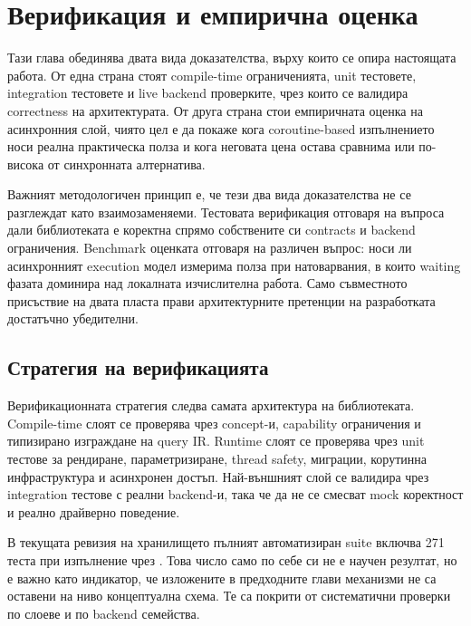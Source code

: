 \section{Верификация и емпирична оценка}
\label{sec:verification_evaluation}

Тази глава обединява двата вида доказателства, върху които се опира настоящата работа. От една страна стоят compile-time ограниченията, unit тестовете, integration тестовете и live backend проверките, чрез които се валидира correctness на архитектурата. От друга страна стои емпиричната оценка на асинхронния слой, чиято цел е да покаже кога coroutine-based изпълнението носи реална практическа полза и кога неговата цена остава сравнима или по-висока от синхронната алтернатива.

Важният методологичен принцип е, че тези два вида доказателства не се разглеждат като взаимозаменяеми. Тестовата верификация отговаря на въпроса дали библиотеката е коректна спрямо собствените си contracts и backend ограничения. Benchmark оценката отговаря на различен въпрос: носи ли асинхронният execution модел измерима полза при натоварвания, в които waiting фазата доминира над локалната изчислителна работа. Само съвместното присъствие на двата пласта прави архитектурните претенции на разработката достатъчно убедителни.

\subsection{Стратегия на верификацията}

Верификационната стратегия следва самата архитектура на библиотеката. Compile-time слоят се проверява чрез concept-и, capability ограничения и типизирано изграждане на query IR. Runtime слоят се проверява чрез unit тестове за рендиране, параметризиране, thread safety, миграции, корутинна инфраструктура и асинхронен достъп. Най-външният слой се валидира чрез integration тестове с реални backend-и, така че да не се смесват mock коректност и реално драйверно поведение.

В текущата ревизия на хранилището пълният автоматизиран suite включва 271 теста при изпълнение чрез . Това число само по себе си не е научен резултат, но е важно като индикатор, че изложените в предходните глави механизми не са оставени на ниво концептуална схема. Те са покрити от систематични проверки по слоеве и по backend семейства.

